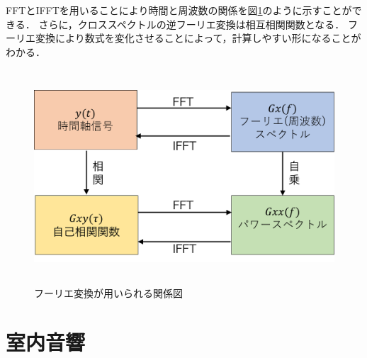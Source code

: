 \documentclass[a4j,11pt]{jsarticle}
\begin{document}
FFTとIFFTを用いることにより時間と周波数の関係を図\ref{fig:fourie}のように示すことができる．
さらに，クロススペクトルの逆フーリエ変換は相互相関関数となる．
フーリエ変換により数式を変化させることによって，計算しやすい形になることがわかる．

\begin{figure}[h]
\begin{center}
 \includegraphics[clip,width=130mm,height=80mm]{fouriesiki.pdf}
\end{center}
 \caption{フーリエ変換が用いられる関係図}
 \label{fig:fourie}
\end{figure}


\newpage

\section{室内音響}
\end{document}
